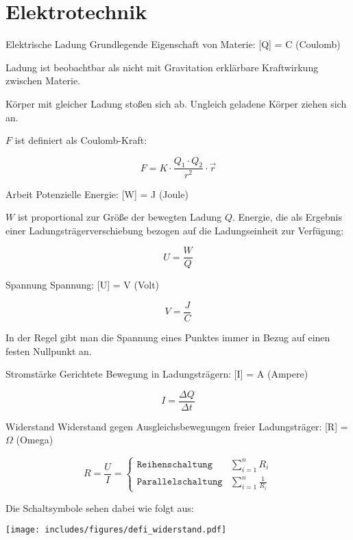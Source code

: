 \section{Elektrotechnik}

\begin{defi}{Elektrische Ladung}
    Grundlegende Eigenschaft von Materie: [Q] = C (Coulomb)

    Ladung ist beobachtbar als nicht mit Gravitation erklärbare Kraftwirkung zwischen Materie.

    Körper mit gleicher Ladung stoßen sich ab.
    Ungleich geladene Körper ziehen sich an.

    $F$ ist definiert als Coulomb-Kraft:

    \[
        F = K \cdot \frac{Q_1 \cdot Q_2}{r^2} \cdot \vec{r}
    \]
\end{defi}

\begin{defi}{Arbeit}
    Potenzielle Energie: [W] = J (Joule)

    $W$ ist proportional zur Größe der bewegten Ladung $Q$.
    Energie, die als Ergebnis einer Ladungsträgerverschiebung bezogen auf die Ladungseinheit zur Verfügung:

    \[
        U = \frac{W}{Q}
    \]
\end{defi}

\begin{defi}{Spannung}
    Spannung: [U] = V (Volt)

    \[
        V = \frac{J}{C}
    \]

    In der Regel gibt man die Spannung eines Punktes immer in Bezug auf einen festen Nullpunkt an.
\end{defi}

\begin{defi}{Stromstärke}
    Gerichtete Bewegung in Ladungsträgern: [I] = A (Ampere)

    \[
        I = \frac{\Delta Q}{\Delta t}
    \]
\end{defi}

\begin{defi}{Widerstand}
    Widerstand gegen Ausgleichsbewegungen freier Ladungsträger: [R] = $\Omega$ (Omega)

    \[
        R = \frac{U}{I} =
        \begin{cases}
            \texttt{Reihenschaltung}   & \sum_{i = 1}^n R_i           \\
            \texttt{Parallelschaltung} & \sum_{i = 1}^n \frac{1}{R_i}
        \end{cases}
    \]

    Die Schaltsymbole sehen dabei wie folgt aus:

    \begin{center}
        \texttt{[image: includes/figures/defi\_widerstand.pdf]}
    \end{center}
\end{defi}

